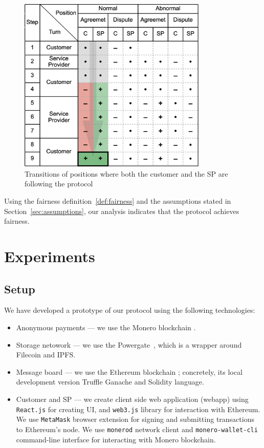 \begin{figure}[h!]
\includegraphics[width=9cm]{rational.png}
\centering
\caption{Transitions of positions where both the customer and the SP are following the protocol}
\label{fig:rational}
\end{figure}

Using the fairness definition~\ref{def:fairness} and the assumptions stated in Section~\ref{sec:assumptions}, our analysis indicates that the protocol achieves fairness.

\section{Experiments}\label{sec:experiments}

\subsection*{Setup}

We have developed a prototype of our protocol using the following technologies:

\begin{itemize}
  \item{Anonymous payments} — we use the Monero blockchain \cite{noetherRingSignatureConfidential2015}.
  \item{Storage netowork} — we use the Powergate~\cite{textilePowergate2023}, which is a wrapper around Filecoin and IPFS.
  \item{Message board} — we use the Ethereum blockchain \cite{woodEthereumSecureDecentralised2014}; concretely, its local development version Truffle Ganache and Solidity language.
  \item{Customer and SP} — we create client side web application (webapp) using \texttt{React.js} for creating UI, and \texttt{web3.js} library for interaction with Ethereum. We use \texttt{MetaMask} browser extension for signing and submitting transactions to Ethereum's node. We use \texttt{monerod} network client and \texttt{monero-wallet-cli} command-line interface for interacting with Monero blockchain.
\end{itemize}

